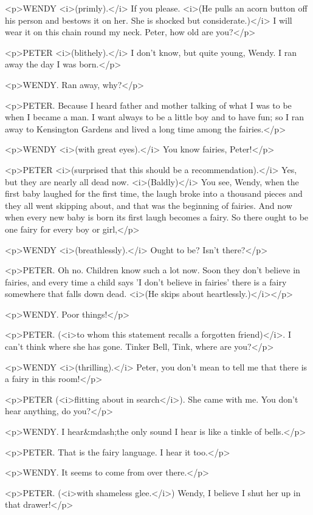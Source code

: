 <p>WENDY <i>(primly).</i> If you please. <i>(He pulls an acorn button off his person and bestows it on her. She is shocked but considerate.)</i> I will wear it on this chain round my neck. Peter, how old are you?</p>

<p>PETER <i>(blithely).</i> I don't know, but quite young, Wendy. I ran away the day I was born.</p>

<p>WENDY. Ran away, why?</p>

<p>PETER. Because I heard father and mother talking of what I was to be when I became a man. I want always to be a little boy and to have fun; so I ran away to Kensington Gardens and lived a long time among the fairies.</p>

<p>WENDY <i>(with great eyes).</i> You know fairies, Peter!</p>

<p>PETER <i>(surprised that this should be a recommendation).</i> Yes, but they are nearly all dead now. <i>(Baldly)</i> You see, Wendy, when the first baby laughed for the first time, the laugh broke into a thousand pieces and they all went skipping about, and that was the beginning of fairies. And now when every new baby is born its first laugh becomes a fairy. So there ought to be one fairy for every boy or girl,</p>

<p>WENDY <i>(breathlessly).</i> Ought to be? Isn't there?</p>

<p>PETER. Oh no. Children know such a lot now. Soon they don't believe in fairies, and every time a child says 'I don't believe in fairies' there is a fairy somewhere that falls down dead. <i>(He skips about heartlessly.)</i></p>

<p>WENDY. Poor things!</p>

<p>PETER. (<i>to whom this statement recalls a forgotten friend)</i>. I can't think where she has gone. Tinker Bell, Tink, where are you?</p>

<p>WENDY <i>(thrilling).</i> Peter, you don't mean to tell me that there is a fairy in this room!</p>

<p>PETER (<i>flitting about in search</i>). She came with me. You don't hear anything, do you?</p>

<p>WENDY. I hear&mdash;the only sound I hear is like a tinkle of bells.</p>

<p>PETER. That is the fairy language. I hear it too.</p>

<p>WENDY. It seems to come from over there.</p>

<p>PETER. (<i>with shameless glee.</i>) Wendy, I believe I shut her up in that drawer!</p>

